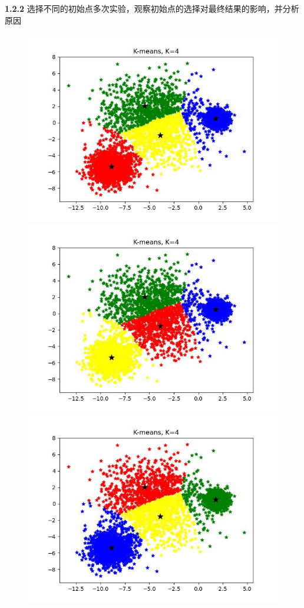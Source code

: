\documentclass[UTF8]{ctexart}
\begin{document}
\noindent \textbf{1.2.2} 选择不同的初始点多次实验，观察初始点的选择对最终结果的影响，并分析原因


\begin{figure}[H]
	\centering
  \begin{minipage}{0.32\linewidth}
		\centering
		\includegraphics[width=0.9\linewidth]{no2-1.jpg}
	\end{minipage}
	\begin{minipage}{0.32\linewidth}
		\centering
		\includegraphics[width=0.9\linewidth]{no2-2.jpg}
	\end{minipage}
  \begin{minipage}{0.32\linewidth}
		\centering
		\includegraphics[width=0.9\linewidth]{no2-3.jpg}
	\end{minipage}


\end{figure}
\end{document}

